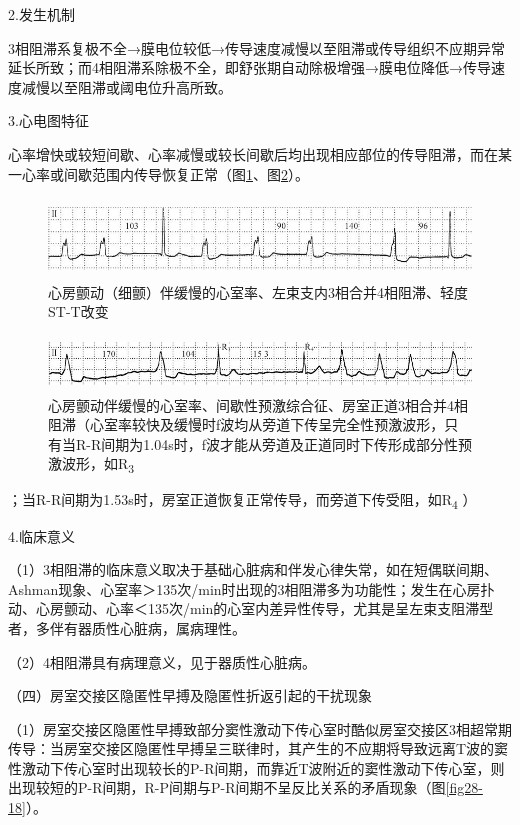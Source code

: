 2.发生机制

3相阻滞系复极不全→膜电位较低→传导速度减慢以至阻滞或传导组织不应期异常延长所致；而4相阻滞系除极不全，即舒张期自动除极增强→膜电位降低→传导速度减慢以至阻滞或阈电位升高所致。

3.心电图特征

心率增快或较短间歇、心率减慢或较长间歇后均出现相应部位的传导阻滞，而在某一心率或间歇范围内传导恢复正常（图\ref{fig28-16}、图\ref{fig28-17}）。

\begin{figure}[!htbp]
 \centering
 \includegraphics[width=5.60417in,height=0.83333in]{./images/Image00477.jpg}
 \captionsetup{justification=centering}
 \caption{心房颤动（细颤）伴缓慢的心室率、左束支内3相合并4相阻滞、轻度ST-T改变}
 \label{fig28-16}
  \end{figure} 

\begin{figure}[!htbp]
 \centering
 \includegraphics[width=5.60417in,height=0.57292in]{./images/Image00478.jpg}
 \captionsetup{justification=centering}
 \caption{心房颤动伴缓慢的心室率、间歇性预激综合征、房室正道3相合并4相阻滞（心室率较快及缓慢时f波均从旁道下传呈完全性预激波形，只有当R-R间期为1.04s时，f波才能从旁道及正道同时下传形成部分性预激波形，如R\textsubscript{3}}
 \label{fig28-17}
  \end{figure} 
；当R-R间期为1.53s时，房室正道恢复正常传导，而旁道下传受阻，如R\textsubscript{4}
）

4.临床意义

（1）3相阻滞的临床意义取决于基础心脏病和伴发心律失常，如在短偶联间期、Ashman现象、心室率＞135次/min时出现的3相阻滞多为功能性；发生在心房扑动、心房颤动、心率＜135次/min的心室内差异性传导，尤其是呈左束支阻滞型者，多伴有器质性心脏病，属病理性。

（2）4相阻滞具有病理意义，见于器质性心脏病。

（四）房室交接区隐匿性早搏及隐匿性折返引起的干扰现象

（1）房室交接区隐匿性早搏致部分窦性激动下传心室时酷似房室交接区3相超常期传导：当房室交接区隐匿性早搏呈三联律时，其产生的不应期将导致远离T波的窦性激动下传心室时出现较长的P-R间期，而靠近T波附近的窦性激动下传心室，则出现较短的P-R间期，R-P间期与P-R间期不呈反比关系的矛盾现象（图\ref{fig28-18}）。

